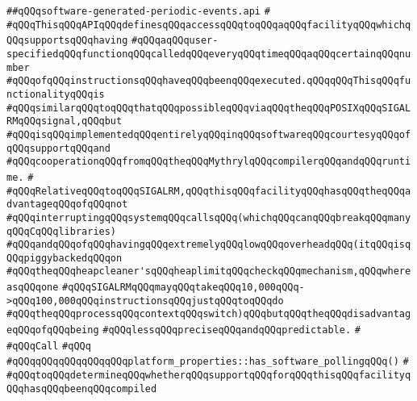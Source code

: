 \label{src/lib/std/src/unsafe/software-generated-periodic-events.api}
\verb|##qQQqsoftware-generated-periodic-events.api|\newline
\verb|#|\newline
\verb|#qQQqThisqQQqAPIqQQqdefinesqQQqaccessqQQqtoqQQqaqQQqfacilityqQQqwhichqQQqsupportsqQQqhaving|\newline
\verb|#qQQqaqQQquser-specifiedqQQqfunctionqQQqcalledqQQqeveryqQQqtimeqQQqaqQQqcertainqQQqnumber|\newline
\verb|#qQQqofqQQqinstructionsqQQqhaveqQQqbeenqQQqexecuted.qQQqqQQqThisqQQqfunctionalityqQQqis|\newline
\verb|#qQQqsimilarqQQqtoqQQqthatqQQqpossibleqQQqviaqQQqtheqQQqPOSIXqQQqSIGALRMqQQqsignal,qQQqbut|\newline
\verb|#qQQqisqQQqimplementedqQQqentirelyqQQqinqQQqsoftwareqQQqcourtesyqQQqofqQQqsupportqQQqand|\newline
\verb|#qQQqcooperationqQQqfromqQQqtheqQQqMythrylqQQqcompilerqQQqandqQQqruntime.|\newline
\verb|#|\newline
\verb|#qQQqRelativeqQQqtoqQQqSIGALRM,qQQqthisqQQqfacilityqQQqhasqQQqtheqQQqadvantageqQQqofqQQqnot|\newline
\verb|#qQQqinterruptingqQQqsystemqQQqcallsqQQq(whichqQQqcanqQQqbreakqQQqmanyqQQqCqQQqlibraries)|\newline
\verb|#qQQqandqQQqofqQQqhavingqQQqextremelyqQQqlowqQQqoverheadqQQq(itqQQqisqQQqpiggybackedqQQqon|\newline
\verb|#qQQqtheqQQqheapcleaner'sqQQqheaplimitqQQqcheckqQQqmechanism,qQQqwhereasqQQqone|\newline
\verb|#qQQqSIGALRMqQQqmayqQQqtakeqQQq10,000qQQq->qQQq100,000qQQqinstructionsqQQqjustqQQqtoqQQqdo|\newline
\verb|#qQQqtheqQQqprocessqQQqcontextqQQqswitch)qQQqbutqQQqtheqQQqdisadvantageqQQqofqQQqbeing|\newline
\verb|#qQQqlessqQQqpreciseqQQqandqQQqpredictable.|\newline
\verb|#|\newline
\verb|#qQQqCall|\newline
\verb|#qQQq|\newline
\verb|#qQQqqQQqqQQqqQQqqQQqplatform_properties::has_software_pollingqQQq()|\newline
\verb|#|\newline
\verb|#qQQqtoqQQqdetermineqQQqwhetherqQQqsupportqQQqforqQQqthisqQQqfacilityqQQqhasqQQqbeenqQQqcompiled|\newline
